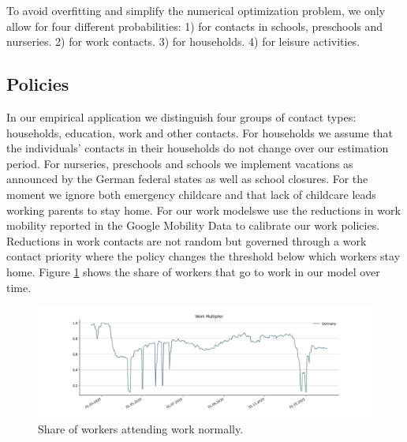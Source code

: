 To avoid overfitting and simplify the numerical optimization problem, we only allow for
four different probabilities: 1) for contacts in schools, preschools and nurseries. 2)
for work contacts. 3) for households. 4) for leisure activities.

\subsection{Policies}

\FloatBarrier

In our empirical application we distinguish four groups of contact types:
households, education, work and other contacts.
For households we assume that the individuals' contacts in their households do not change
over our estimation period.
For nurseries, preschools and schools we implement vacations as announced by the German
federal states as well as school closures. For the moment we ignore both emergency
childcare and that lack of childcare leads working parents to stay home.
%
%
%
%
For our work models\footnotemark we use the reductions in work mobility reported in the
Google Mobility Data \citep{Google2021} to calibrate our work policies.
Reductions in work contacts are not random but governed through a work contact priority
where the policy changes the threshold below which workers stay home.
Figure \ref{fig:work_multiplier} shows the share of workers that go to work in our model
over time.

\begin{figure}[ht]
    \centering
    \includegraphics[width=1.1 \textwidth]{../figures/work_multiplier.png}
    \caption{Share of workers attending work normally.}
    \label{fig:work_multiplier}
\end{figure}

